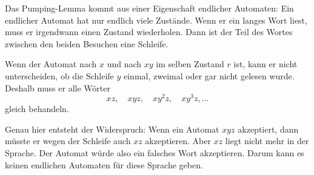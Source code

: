 \documentclass[a4paper,12pt]{article}
\begin{document}
Das Pumping-Lemma kommt aus einer Eigenschaft endlicher Automaten:
Ein endlicher Automat hat nur endlich viele Zustände.
Wenn er ein langes Wort liest, muss er irgendwann einen Zustand wiederholen.
Dann ist der Teil des Wortes zwischen den beiden Besuchen eine Schleife.

\begin{center}
\end{center}

Wenn der Automat nach $x$ und nach $xy$ im selben Zustand $r$ ist, kann er nicht unterscheiden,
ob die Schleife $y$ einmal, zweimal oder gar nicht gelesen wurde.
Deshalb muss er alle Wörter
\[
    xz,\quad xyz,\quad xy^2z,\quad xy^3z,\ldots
\]
gleich behandeln.

\medskip
Genau hier entsteht der Widerspruch:
Wenn ein Automat $xyz$ akzeptiert, dann müsste er wegen der Schleife auch $xz$ akzeptieren.
Aber $xz$ liegt nicht mehr in der Sprache.
Der Automat würde also ein falsches Wort akzeptieren.
Darum kann es keinen endlichen Automaten für diese Sprache geben.
\end{document}
